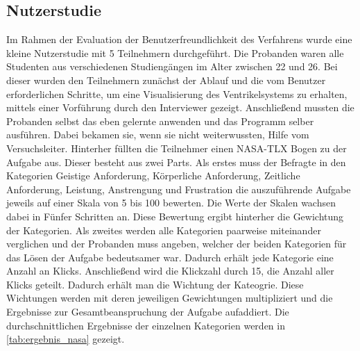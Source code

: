 \subsection{Nutzerstudie}


Im Rahmen der Evaluation der Benutzerfreundlichkeit des Verfahrens wurde eine kleine Nutzerstudie mit 5 Teilnehmern durchgeführt. Die Probanden waren alle Studenten aus verschiedenen Studiengängen im Alter zwischen 22 und 26.
\newline
Bei dieser wurden den Teilnehmern zunächst der Ablauf und die vom Benutzer erforderlichen Schritte, um eine Visualisierung des Ventrikelsystems zu erhalten, mittels einer Vorführung durch den Interviewer gezeigt. Anschließend mussten die Probanden selbst das eben gelernte anwenden und das Programm selber ausführen. Dabei bekamen sie, wenn sie nicht weiterwussten, Hilfe vom Versuchsleiter.
\newline
Hinterher füllten die Teilnehmer einen NASA-TLX Bogen zu der Aufgabe aus. Dieser besteht aus zwei Parts. Als erstes muss der Befragte in den Kategorien Geistige Anforderung, Körperliche Anforderung, Zeitliche Anforderung, Leistung, Anstrengung und Frustration die auszuführende Aufgabe jeweils auf einer Skala von 5 bis 100 bewerten. Die Werte der Skalen wachsen dabei in Fünfer Schritten an. Diese Bewertung ergibt hinterher die Gewichtung der Kategorien.
\newline
Als zweites werden alle Kategorien paarweise miteinander verglichen und der Probanden muss angeben, welcher der beiden Kategorien für das Lösen der Aufgabe bedeutsamer war. Dadurch erhält jede Kategorie eine Anzahl an Klicks.
\newline
 Anschließend wird die Klickzahl durch 15, die Anzahl aller Klicks geteilt. Dadurch erhält man die Wichtung der Kateogrie. Diese Wichtungen werden mit deren jeweiligen Gewichtungen multipliziert und die Ergebnisse zur Gesamtbeanspruchung der Aufgabe aufaddiert.
\newline
Die durchschnittlichen Ergebnisse der einzelnen Kategorien werden in \autoref{tab:ergebnis_nasa} gezeigt.


\begin{table}[H]
\centering
{}
\caption{Durchschnittlichen Ergebnisse des NASA-TLX Bogens}
\label{tab:ergebnis_nasa}
\end{table}


